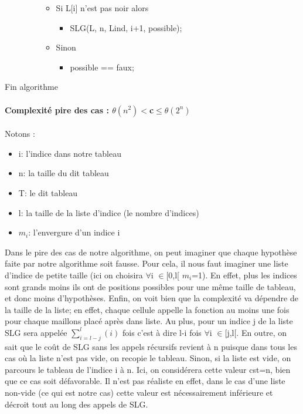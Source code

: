 \documentclass{article}
\begin{document}
\begin{description}
\begin{itemize}
\begin{itemize}
    \item Si L[i] n'est pas noir alors
      \begin{itemize}
      \item SLG(L, n, Lind, i+1, possible);
      \end{itemize}
    \item Sinon 
      \begin{itemize}
      \item possible == faux;
      \end{itemize}
    \end{itemize}
  \end{itemize}
\item[Fin algorithme]
\end{description}
\newpage
\paragraph{Complexité pire des cas : $\theta(n^2) <$c$\leq\theta(2^n)$\\ }
 Notons :
\begin{itemize}
\item i: l'indice dans notre tableau
\item n: la taille du dit tableau
\item T: le dit tableau
\item l: la taille de la liste d'indice (le nombre d'indices)
\item $m_i$: l'envergure d'un indice i
\end{itemize}
Dans le pire des cas de notre algorithme, on peut imaginer que chaque hypothèse faite par notre algorithme soit fausse. Pour cela, il nous faut imaginer une liste d'indice de petite taille (ici on choisira $\forall$i $\in$[0,l[ $m_i$=1). En effet, plus les indices sont grands moins ils ont de positions possibles pour une même taille de tableau, et donc moins d'hypothèses.
\newline Enfin, on voit bien que la complexité va dépendre de la taille de la liste; en effet, chaque cellule appelle la fonction au moins une fois pour chaque maillons placé après dans liste. Au plus, pour un indice j de la liste SLG sera appelée $\sum_{i=l-j}^{l} (i)$ fois c'est à dire l-i fois $\forall$i $\in$[j,l[.
\newline En outre, on sait que le coût de SLG sans les appels récursifs revient à n puisque dans tous les cas où la liste n'est pas vide, on recopie le tableau. Sinon, si la liste est vide, on parcours le tableau de l'indice i à n. Ici, on considérera cette valeur cst=n, bien que ce cas soit défavorable. Il n'est pas réaliste en effet, dans le cas d'une liste non-vide (ce qui est notre cas) cette valeur est nécessairement inférieure et décroit tout au long des appels de SLG.
\end{document}
